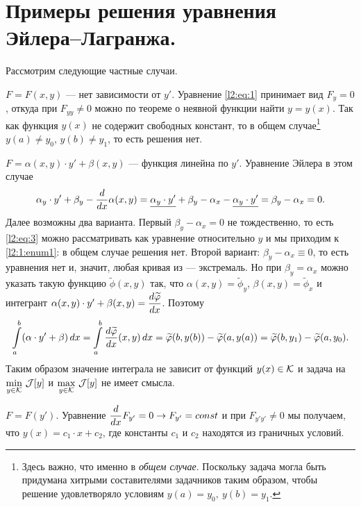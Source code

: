 \section{Примеры решения уравнения Эйлера--Лагранжа.}
\label{lecture2section1}
Рассмотрим следующие частные случаи.
\begin{enumerate1}
	\item \label{l2:1:enum1} $F=F(x,y)$ --- нет зависимости от $y'$. Уравнение \eqref{l2:eq:1} принимает вид $F_y=0$, откуда при $F_{yy}\neq0$ можно по теореме о неявной функции найти $y=y(x)$. Так как функция $y(x)$ не содержит свободных констант, то в общем случае\footnote[1]{Здесь важно, что именно в \emph{общем случае}. Поскольку задача могла быть придумана хитрыми составителями задачников таким образом, чтобы решение удовлетворяло условиям $y(a)=y_0,\  y(b)=y_1$.} $y(a)\neq y_0$, $y(b)\neq y_1$, то есть решения нет. 
	
	\item  $F=\alpha(x,y)\cdot y'+\beta(x,y)$ --- функция линейна по $y'$. Уравнение Эйлера в этом случае
	\begin{equation}
		\label{l2:eq:3}
		\alpha_y\cdot y'+\beta_y-\frac{d}{dx}\alpha(x,y)=\underline{\alpha_y\cdot y'}+\beta_y-\alpha_x-\underline{\alpha_y\cdot y'}=\beta_y-\alpha_x=0.
	\end{equation}
	Далее возможны два варианта. Первый $\beta_y-\alpha_x=0$ не тождественно, то есть \eqref{l2:eq:3} можно рассматривать как уравнение относительно $y$ и мы приходим к \ref{l2:1:enum1}: в общем случае решения нет. 
	\noindent Второй вариант: $\beta_y-\alpha_x\equiv0$, то есть уравнения нет и, значит, любая кривая из \K --- экстремаль. Но при $\beta_y=\alpha_x$ можно указать такую функцию $\widetilde{\phi}(x,y)$ так, что $\alpha(x,y)=\widetilde{\phi}_y$, $\beta(x,y)=\widetilde{\phi}_x$ и интегрант $\alpha(x,y)\cdot y'+\beta(x,y)=\displaystyle\frac{d\widetilde{\varphi}}{dx}$. Поэтому 
	\begin{equation*}
		\int\limits_a^b(\alpha\cdot y'+\beta)\,dx=\int\limits_a^b\frac{d\widetilde{\varphi}}{dx}(x,y)\,dx=\widetilde{\varphi}(b,y(b))-\widetilde{\varphi}(a,y(a))=\widetilde{\varphi}(b,y_1)-\widetilde{\varphi}(a,y_0).
	\end{equation*}
	Таким образом значение интеграла не зависит от функций $y(x)\in\mathcal{K}$ и задача на $\min\limits_{y\in\mathcal{K}}\,\mathcal{J}[y]$ и $\max\limits_{y\in\mathcal{K}}\,\mathcal{J}[y]$ не имеет смысла.
	
	\item $F=F(y')$. Уравнение $\displaystyle\frac{d}{dx}F_{y'}=0\rightarrow F_{y'}=const$ и при $F_{y'y'}\neq0$ мы получаем, что $y(x)=c_1\cdot x+c_2$, где константы $c_1$ и $c_2$ находятся из граничных условий.
	

\end{enumerate1}
